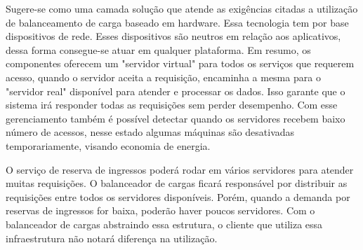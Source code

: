 Sugere-se como uma camada solução que atende as exigências citadas a utilização de balanceamento de carga baseado 
em hardware.
Essa tecnologia tem por base dispositivos de rede. Esses dispositivos são neutros em relação aos aplicativos, dessa forma
consegue-se atuar em qualquer plataforma. Em resumo, os componentes oferecem um "servidor virtual" para todos os serviços
que requerem acesso, quando o servidor aceita a requisição, encaminha a mesma para o "servidor real" disponível para atender
e processar os dados.
Isso garante que o sistema irá responder todas as requisições sem perder desempenho.
Com esse gerenciamento também é possível detectar quando os servidores recebem baixo número de acessos, nesse
estado algumas máquinas são desativadas temporariamente, visando economia de energia.

O serviço de reserva de ingressos poderá rodar em vários servidores para atender muitas requisições.
O balanceador de cargas ficará responsável por distribuir as requisições entre todos os servidores disponíveis.
Porém, quando a demanda por reservas de ingressos for baixa, poderão haver poucos servidores.
Com o balanceador de cargas abstraindo essa estrutura, o cliente que utiliza essa infraestrutura
não notará diferença na utilização.

